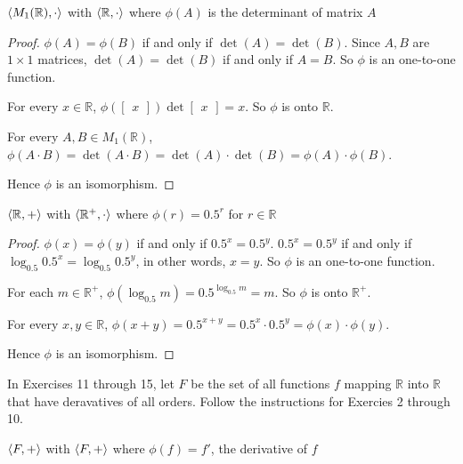 \begin{exercise}
    $\left\langle{M_{1}(\mathbb{R}),\cdot}\right\rangle$ with $\left\langle{\mathbb{R},\cdot}\right\rangle$ where $\phi(A)$ is the determinant of matrix $A$
\end{exercise}

\begin{proof}
    $\phi(A) = \phi(B)$ if and only if $\det(A) = \det(B)$. Since $A, B$ are $1\times 1$ matrices, $\det(A) = \det(B)$ if and only if $A = B$. So $\phi$ is an one-to-one function.

    For every $x\in\mathbb{R}$, $\phi(\begin{bmatrix}x\end{bmatrix})\det\begin{bmatrix}x\end{bmatrix} = x$. So $\phi$ is onto $\mathbb{R}$.

    For every $A, B\in M_{1}(\mathbb{R})$, $\phi(A\cdot B) = \det(A\cdot B) = \det(A)\cdot\det(B) = \phi(A)\cdot\phi(B)$.

    Hence $\phi$ is an isomorphism.
\end{proof}

\begin{exercise}
    $\left\langle{\mathbb{R}, +}\right\rangle$ with $\left\langle{\mathbb{R}^{+},\cdot}\right\rangle$ where $\phi(r) = {0.5}^{r}$ for $r\in\mathbb{R}$
\end{exercise}

\begin{proof}
    $\phi(x) = \phi(y)$ if and only if ${0.5}^{x} = {0.5}^{y}$. ${0.5}^{x} = {0.5}^{y}$ if and only if $\log_{0.5}{0.5}^{x} = \log_{0.5}{0.5}^{y}$, in other words, $x = y$. So $\phi$ is an one-to-one function.

    For each $m\in\mathbb{R}^{+}$, $\phi(\log_{0.5}m) = {0.5}^{\log_{0.5}m} = m$. So $\phi$ is onto $\mathbb{R}^{+}$.

    For every $x, y\in\mathbb{R}$, $\phi(x + y) = {0.5}^{x+y} = {0.5}^{x}\cdot{0.5}^{y} = \phi(x)\cdot\phi(y)$.

    Hence $\phi$ is an isomorphism.
\end{proof}

In Exercises 11 through 15, let $F$ be the set of all functions $f$ mapping $\mathbb{R}$ into $\mathbb{R}$ that have deravatives of all orders. Follow the instructions for Exercies 2 through 10.

\begin{exercise}
    $\left\langle{F,+}\right\rangle$ with $\left\langle{F,+}\right\rangle$ where $\phi(f) = f'$, the derivative of $f$
\end{exercise}

